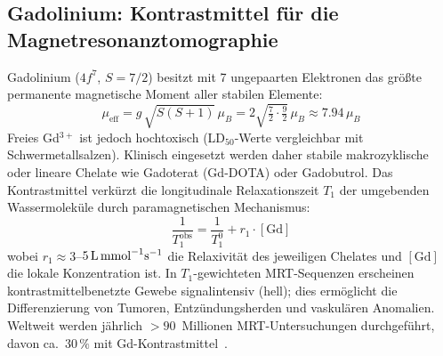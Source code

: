 ﻿\documentclass[12pt, a4paper]{report}
\theoremstyle{definition}
\theoremstyle{remark}
\begin{document}
\subsection{Gadolinium: Kontrastmittel für die Magnetresonanztomographie}

Gadolinium ($4f^7$, $S = 7/2$) besitzt mit 7 ungepaarten Elektronen das
größte permanente magnetische Moment aller stabilen Elemente:
\begin{equation}
  \mu_{\text{eff}} = g\,\sqrt{S(S+1)}\,\mu_B = 2\sqrt{\tfrac{7}{2}\cdot\tfrac{9}{2}}\,\mu_B
  \approx 7.94\,\mu_B
  \label{eq:gd_moment}
\end{equation}
Freies Gd$^{3+}$ ist jedoch hochtoxisch (LD$_{50}$-Werte vergleichbar mit
Schwermetallsalzen). Klinisch eingesetzt werden daher stabile makrozyklische
oder lineare Chelate wie Gadoterat (Gd-DOTA) oder Gadobutrol. Das
Kontrastmittel verkürzt die longitudinale Relaxationszeit $T_1$ der
umgebenden Wassermoleküle durch paramagnetischen Mechanismus:
\begin{equation}
  \frac{1}{T_1^{\text{obs}}} = \frac{1}{T_1^0} + r_1 \cdot [\text{Gd}]
  \label{eq:solomon}
\end{equation}
wobei $r_1 \approx 3$--$5\,\text{L\,mmol}^{-1}\text{s}^{-1}$ die Relaxivität
des jeweiligen Chelates und $[\text{Gd}]$ die lokale Konzentration ist.
In $T_1$-gewichteten MRT-Sequenzen erscheinen kontrastmittelbenetzte Gewebe
signalintensiv (hell); dies ermöglicht die Differenzierung von Tumoren,
Entzündungsherden und vaskulären Anomalien. Weltweit werden jährlich
$>90$~Millionen MRT-Untersuchungen durchgeführt, davon ca.~$30\,\%$ mit
Gd-Kontrastmittel~\cite{balaram2019}.
\end{document}

